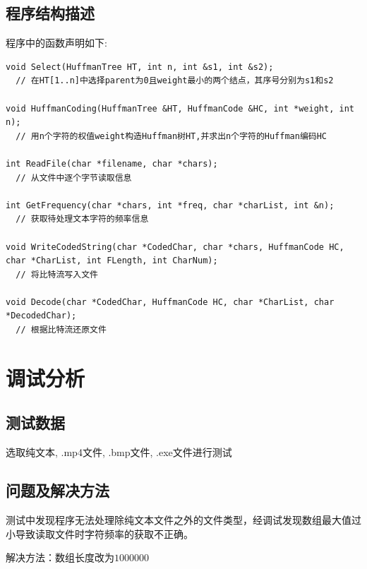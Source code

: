 \documentclass[UTF8]{ctexart}
\begin{document}
\subsection{程序结构描述}
程序中的函数声明如下:
\begin{lstlisting}
void Select(HuffmanTree HT, int n, int &s1, int &s2);
  // 在HT[1..n]中选择parent为0且weight最小的两个结点，其序号分别为s1和s2

void HuffmanCoding(HuffmanTree &HT, HuffmanCode &HC, int *weight, int n);
  // 用n个字符的权值weight构造Huffman树HT,并求出n个字符的Huffman编码HC

int ReadFile(char *filename, char *chars);
  // 从文件中逐个字节读取信息

int GetFrequency(char *chars, int *freq, char *charList, int &n);
  // 获取待处理文本字符的频率信息

void WriteCodedString(char *CodedChar, char *chars, HuffmanCode HC, char *CharList, int FLength, int CharNum);
  // 将比特流写入文件

void Decode(char *CodedChar, HuffmanCode HC, char *CharList, char *DecodedChar);
  // 根据比特流还原文件
\end{lstlisting}
\section{调试分析}
\subsection{测试数据}
选取纯文本, .mp4文件, .bmp文件, .exe文件进行测试
\subsection{问题及解决方法}
测试中发现程序无法处理除纯文本文件之外的文件类型，经调试发现数组最大值过小导致读取文件时字符频率的获取不正确。

解决方法：数组长度改为$1000000$
\end{document}

